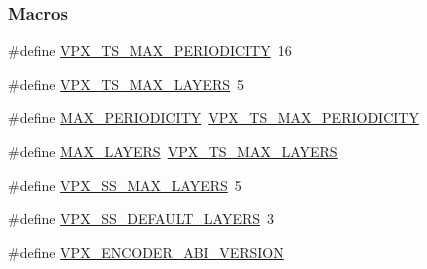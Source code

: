 \subsubsection*{Macros}
\begin{DoxyCompactItemize}
\item 
\#define \hyperlink{group__encoder_ga684b48cb6e47a258247637186557eb19}{V\+P\+X\+\_\+\+T\+S\+\_\+\+M\+A\+X\+\_\+\+P\+E\+R\+I\+O\+D\+I\+C\+I\+T\+Y}~16
\item 
\#define \hyperlink{group__encoder_ga2715ac3dd8bf2f5438c4bbfc82788eb2}{V\+P\+X\+\_\+\+T\+S\+\_\+\+M\+A\+X\+\_\+\+L\+A\+Y\+E\+R\+S}~5
\item 
\#define \hyperlink{group__encoder_gae6569d89cc61cb190aeeb00a1b40ad88}{M\+A\+X\+\_\+\+P\+E\+R\+I\+O\+D\+I\+C\+I\+T\+Y}~\hyperlink{group__encoder_ga684b48cb6e47a258247637186557eb19}{V\+P\+X\+\_\+\+T\+S\+\_\+\+M\+A\+X\+\_\+\+P\+E\+R\+I\+O\+D\+I\+C\+I\+T\+Y}
\item 
\#define \hyperlink{group__encoder_gade9d4b2ac5f29fe89ffea40e7c58c9d6}{M\+A\+X\+\_\+\+L\+A\+Y\+E\+R\+S}~\hyperlink{group__encoder_ga2715ac3dd8bf2f5438c4bbfc82788eb2}{V\+P\+X\+\_\+\+T\+S\+\_\+\+M\+A\+X\+\_\+\+L\+A\+Y\+E\+R\+S}
\item 
\#define \hyperlink{group__encoder_ga8ee6b12a5f4c97d9767adffb88fff7da}{V\+P\+X\+\_\+\+S\+S\+\_\+\+M\+A\+X\+\_\+\+L\+A\+Y\+E\+R\+S}~5
\item 
\#define \hyperlink{group__encoder_ga8324b8c1ebf8a80253d544584f9439eb}{V\+P\+X\+\_\+\+S\+S\+\_\+\+D\+E\+F\+A\+U\+L\+T\+\_\+\+L\+A\+Y\+E\+R\+S}~3
\item 
\hypertarget{group__encoder_gaa4f0b52293c08ba672429c3a03648b9d}{\#define \hyperlink{group__encoder_gaa4f0b52293c08ba672429c3a03648b9d}{V\+P\+X\+\_\+\+E\+N\+C\+O\+D\+E\+R\+\_\+\+A\+B\+I\+\_\+\+V\+E\+R\+S\+I\+O\+N}}\label{group__encoder_gaa4f0b52293c08ba672429c3a03648b9d}


\end{DoxyCompactItemize}
